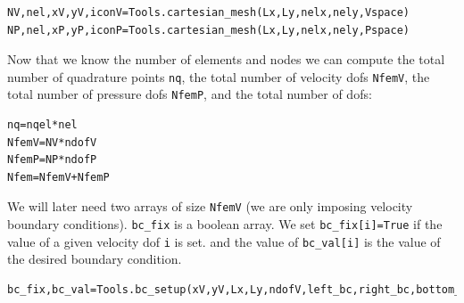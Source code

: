 \begin{lstlisting}
NV,nel,xV,yV,iconV=Tools.cartesian_mesh(Lx,Ly,nelx,nely,Vspace)
NP,nel,xP,yP,iconP=Tools.cartesian_mesh(Lx,Ly,nelx,nely,Pspace)
\end{lstlisting}

Now that we know the number of elements and nodes we can compute the 
total number of quadrature points \lstinline{nq}, 
the total number of velocity dofs \lstinline{NfemV}, 
the total number of pressure dofs \lstinline{NfemP}, 
and the total number of dofs:

\begin{lstlisting}
nq=nqel*nel
NfemV=NV*ndofV
NfemP=NP*ndofP
Nfem=NfemV+NfemP
\end{lstlisting}

We will later need two arrays of size \lstinline{NfemV} (we are only imposing
velocity boundary conditions). \lstinline{bc_fix} is a boolean array.
We set \lstinline{bc_fix[i]=True} if the value of a given velocity dof \lstinline{i} is set. 
and the value of \lstinline{bc_val[i]} is the value of the desired boundary condition.

\begin{lstlisting}
bc_fix,bc_val=Tools.bc_setup(xV,yV,Lx,Ly,ndofV,left_bc,right_bc,bottom_bc,top_bc)
\end{lstlisting}












